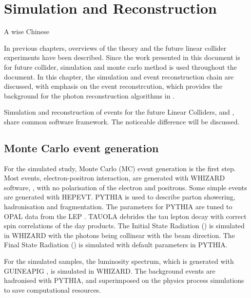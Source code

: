 \chapter{Simulation and Reconstruction}
\label{chap:Reconstruction}

%
{A wise Chinese}%


In previous chapters, overviews of the theory and the future linear collider experiments have been described. Since the work presented in this document is for future collider, simulation and monte carlo method is used throughout the document. In this chapter, the simulation and event reconstruction chain are discussed, with emphasis on the \pandora event reconstrcution, which provides the background for the photon reconstruction algorithms in .

Simulation and reconstruction of events for the future Linear Colliders, \ILC and \CLIC, share common software framework. The noticeable difference will be discussed.

\section{Monte Carlo event generation}

For the simulated study, Monte Carlo (MC) event generation is the first step. Most events, electron-positron interaction, are generated with WHIZARD software, \cite{whizard,Moretti:2001zz}, with no polarisation of the electron and positrons. Some simple events are generated with HEPEVT. PYTHIA \cite{Sjostrand:1995iq} is used to describe parton showering, hadronisation and fragmentation. The parameters for PYTHIA are tuned to OPAL data from the LEP \cite{Alexander:1995bk}. TAUOLA \cite{Jadach:1993hs} debrides the tau lepton decay with correct spin correlations of the day products. The Initial State Radiation (\ISR) is simulated in WHIZARD with the \ISR photons being collinear with the beam direction. The Final State Radiation (\FSR) is simulated with default parameters in PYTHIA.

For the \CLIC simulated samples, the luminosity spectrum, which is generated with GUINEAPIG \cite{Schulte:1999tx}, is simulated in WHIZARD. The \ggHad background events are hadronised with PYTHIA, and superimposed on the physics process simulations to save computational resources.



